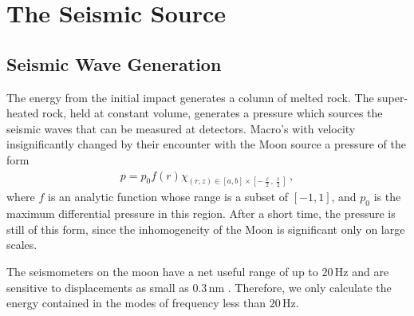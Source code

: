 \documentclass[prd,reprint,10pt]{revtex4-1}
\newcommand*\te[1]{\text{#1}}
\newcommand*\f[2]{\frac{#1}{#2}}
\begin{document}
\section{The Seismic Source}
\subsection{Seismic Wave Generation}
The energy from the initial impact generates a column of melted rock. The super-heated rock, held at constant volume, generates a pressure which sources the seismic waves that can be measured at detectors. Macro's with velocity insignificantly changed by their encounter with the Moon source a pressure of the form
\begin{align}
p = p_0 f(r)\chi_{(r,z)\in [a,b]\times [-\f \ell 2,\f \ell 2]}\,,
\end{align}
where $f$ is an analytic function whose range is a subset of $[-1,1]$, and $p_0$ is the maximum differential pressure in this region. After a short time, the pressure is still of this form, since the inhomogeneity of the Moon is significant only on large scales.

The seismometers on the moon have a net useful range of up to $20\,\te{Hz}$ and are sensitive to displacements as small as $0.3\,\text{nm}$ \cite{latham1973lunar}. Therefore, we only calculate the energy contained in the modes of frequency less than $20\,\te{Hz}$. 
\end{document}
